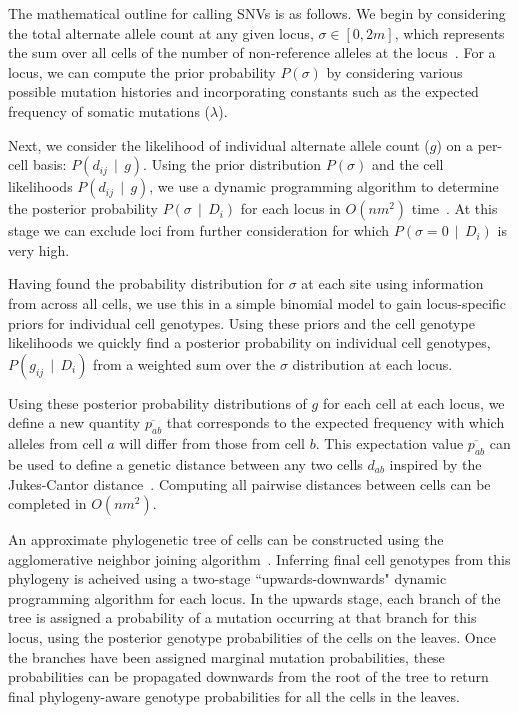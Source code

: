 \documentclass[../../main.tex]{subfiles}
\begin{document}
The mathematical outline for calling SNVs is as follows.
We begin by considering the total alternate allele count at any given locus, $\sigma\in [0,2m]$, which represents the sum over all cells of the number of non-reference alleles at the locus~\cite{monovar, listatistical}.
For a locus, we can compute the prior probability $P(\sigma)$ by considering various possible mutation histories and incorporating constants such as the expected frequency of somatic mutations ($\lambda$).

Next, we consider the likelihood of individual alternate allele count ($g$) on a per-cell basis: $P(d_{ij}\,\mid\,g)$.
Using the prior distribution $P(\sigma)$ and the cell likelihoods $P(d_{ij}\,\mid\,g)$, we use a dynamic programming algorithm to determine the posterior probability $P(\sigma\,\mid\,D_i)$ for each locus in $O(nm^2)$ time~\cite{monovar, ledurbin, listatistical}.
At this stage we can exclude loci from further consideration for which $P(\sigma = 0\,\mid\, D_i)$ is very high.

Having found the probability distribution for $\sigma$ at each site using information from across all cells, we use this in a simple binomial model to gain locus-specific priors for individual cell genotypes.
Using these priors and the cell genotype likelihoods we quickly find a posterior probability on individual cell genotypes, $P(g_{ij}\,\mid\, D_i)$ from a weighted sum over the $\sigma$ distribution at each locus.

Using these posterior probability distributions of $g$ for each cell at each locus, we define a new quantity $\overline{p_{ab}}$ that corresponds to the expected frequency with which alleles from cell $a$ will differ from those from cell $b$.
This expectation value $\overline{p_{ab}}$ can be used to define a genetic distance between any two cells $d_{ab}$ inspired by the Jukes-Cantor distance~\cite{BSA, JC}.
Computing all pairwise distances between cells can be completed in $O(nm^2)$.

An approximate phylogenetic tree of cells can be constructed using the agglomerative neighbor joining algorithm~\cite{BSA, NJ}.
Inferring final cell genotypes from this phylogeny is acheived using a two-stage ``upwards-downwards" dynamic programming algorithm for each locus.
In the upwards stage, each branch of the tree is assigned a probability of a mutation occurring at that branch for this locus, using the posterior genotype probabilities of the cells on the leaves.
Once the branches have been assigned marginal mutation probabilities, these probabilities can be propagated downwards from the root of the tree to return final phylogeny-aware genotype probabilities for all the cells in the leaves.
\end{document}
